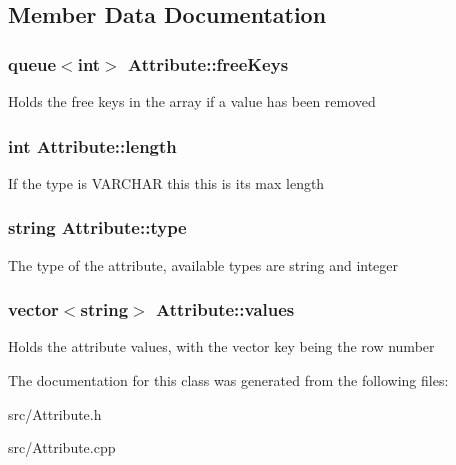 \subsection{Member Data Documentation}
\hypertarget{class_attribute_a0b0da13208f7c429f72e766c977f9e40}{
\subsubsection[{free\-Keys}]{\setlength{\rightskip}{0pt plus 5cm}queue$<$int$>$ Attribute\-::free\-Keys\hspace{0.3cm}{\ttfamily [private]}}}\label{class_attribute_a0b0da13208f7c429f72e766c977f9e40}
Holds the free keys in the array if a value has been removed \hypertarget{class_attribute_ace310d0f9b59ecde4923c401852112d0}{
\subsubsection[{length}]{\setlength{\rightskip}{0pt plus 5cm}int Attribute\-::length\hspace{0.3cm}{\ttfamily [private]}}}\label{class_attribute_ace310d0f9b59ecde4923c401852112d0}
If the type is {\ttfamily V\-A\-R\-C\-H\-A\-R} this this is its max length \hypertarget{class_attribute_abc17bc58ec6c45b21533ee2194bf2516}{
\subsubsection[{type}]{\setlength{\rightskip}{0pt plus 5cm}string Attribute\-::type\hspace{0.3cm}{\ttfamily [private]}}}\label{class_attribute_abc17bc58ec6c45b21533ee2194bf2516}
The type of the attribute, available types are {\ttfamily string} and {\ttfamily integer} \hypertarget{class_attribute_ae3eb3292f5ddc91f6c2c0152edf625fb}{
\subsubsection[{values}]{\setlength{\rightskip}{0pt plus 5cm}vector$<$string$>$ Attribute\-::values\hspace{0.3cm}{\ttfamily [private]}}}\label{class_attribute_ae3eb3292f5ddc91f6c2c0152edf625fb}
Holds the attribute values, with the vector key being the row number 

The documentation for this class was generated from the following files\-:\begin{DoxyCompactItemize}
\item 
src/Attribute.\-h\item 
src/Attribute.\-cpp\end{DoxyCompactItemize}
